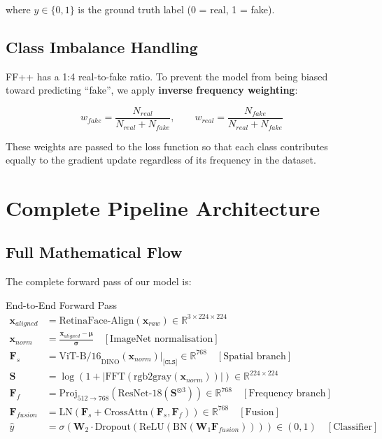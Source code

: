 \documentclass[12pt,a4paper]{article}
\begin{document}
where $y \in \{0, 1\}$ is the ground truth label (0 = real, 1 = fake).

\subsection{Class Imbalance Handling}

FF++ has a 1:4 real-to-fake ratio. To prevent the model from being biased toward
predicting ``fake'', we apply \textbf{inverse frequency weighting}:

\begin{equation}
  w_{fake} = \frac{N_{real}}{N_{real} + N_{fake}}, \qquad
  w_{real} = \frac{N_{fake}}{N_{real} + N_{fake}}
\end{equation}

These weights are passed to the loss function so that each class contributes equally
to the gradient update regardless of its frequency in the dataset.

\newpage

\section{Complete Pipeline Architecture}

\subsection{Full Mathematical Flow}

The complete forward pass of our model is:

\begin{mathbox}{End-to-End Forward Pass}
\begin{align}
  \mathbf{x}_{aligned} &= \text{RetinaFace-Align}(\mathbf{x}_{raw}) \in \mathbb{R}^{3 \times 224 \times 224} \\[4pt]
  \mathbf{x}_{norm} &= \frac{\mathbf{x}_{aligned} - \boldsymbol{\mu}}{\boldsymbol{\sigma}}
    \quad [\text{ImageNet normalisation}] \\[4pt]
  \mathbf{F}_s &= \text{ViT-B/16}_{\text{DINO}}(\mathbf{x}_{norm})\big|_{\texttt{[CLS]}}
    \in \mathbb{R}^{768}
    \quad [\text{Spatial branch}] \\[4pt]
  \mathbf{S} &= \log\!\left(1 + \big|\text{FFT}(\text{rgb2gray}(\mathbf{x}_{norm}))\big|\right) \in \mathbb{R}^{224 \times 224} \\[4pt]
  \mathbf{F}_f &= \text{Proj}_{512 \to 768}\!\left(\text{ResNet-18}(\mathbf{S}^{\otimes 3})\right)
    \in \mathbb{R}^{768}
    \quad [\text{Frequency branch}] \\[4pt]
  \mathbf{F}_{fusion} &= \text{LN}\!\left(\mathbf{F}_s + \text{CrossAttn}(\mathbf{F}_s, \mathbf{F}_f)\right)
    \in \mathbb{R}^{768}
    \quad [\text{Fusion}] \\[4pt]
  \hat{y} &= \sigma\!\left(\mathbf{W}_2 \cdot \text{Dropout}(\text{ReLU}(\text{BN}(\mathbf{W}_1 \mathbf{F}_{fusion})))\right)
    \in (0,1)
    \quad [\text{Classifier}]
\end{align}
\end{mathbox}
\end{document}
